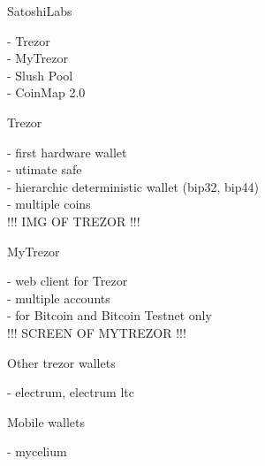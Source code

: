 \documentclass{beamer}
\begin{document}
\begin{frame}

    {\LARGE SatoshiLabs}\\

    \vspace{5mm}

    - Trezor\\
    - MyTrezor\\
    - Slush Pool\\
    - CoinMap 2.0\\

\end{frame}

\begin{frame}

    {\LARGE Trezor}\\

    \vspace{5mm}

    - first hardware wallet\\
    - utimate safe\\
    - hierarchic deterministic wallet (bip32, bip44)\\
    - multiple coins\\

    !!! IMG OF TREZOR !!!  %

\end{frame}

\begin{frame}

    {\LARGE MyTrezor}\\

    \vspace{5mm}

    - web client for Trezor\\
    - multiple accounts\\
    - for Bitcoin and Bitcoin Testnet only\\

    !!! SCREEN OF MYTREZOR !!!  %

\end{frame}

\begin{frame}

    {\LARGE Other trezor wallets}\\

    \vspace{5mm}

    - electrum, electrum ltc\\

    \vspace{10mm}

    {\LARGE Mobile wallets}\\

    \vspace{5mm}

    - mycelium\\

\end{frame}
\end{document}
